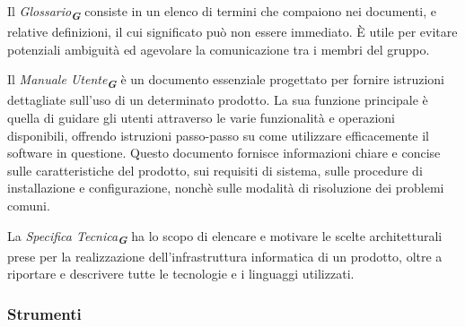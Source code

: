 Il \emph{Glossario}\textsubscript{\textit{\textbf{G}}} consiste in un elenco di termini che compaiono nei documenti, e relative definizioni, 
il cui significato può non essere immediato. È utile per evitare potenziali ambiguità ed agevolare la comunicazione tra i membri del gruppo.

Il \emph{Manuale Utente}\textsubscript{\textit{\textbf{G}}} è un documento essenziale progettato per fornire istruzioni dettagliate
sull’uso di un determinato prodotto. La sua funzione principale è quella di guidare gli utenti attraverso le varie funzionalità e operazioni disponibili, 
offrendo istruzioni passo-passo su come utilizzare efficacemente il software in questione. Questo documento fornisce informazioni chiare e concise 
sulle caratteristiche del prodotto, sui requisiti di sistema, sulle procedure di installazione e configurazione, nonchè sulle modalità 
di risoluzione dei problemi comuni.

La \emph{Specifica Tecnica}\textsubscript{\textit{\textbf{G}}} ha lo scopo di elencare e motivare le scelte architetturali prese per
la realizzazione dell’infrastruttura informatica di un prodotto, oltre a riportare e descrivere tutte le tecnologie e i linguaggi utilizzati.


\subsubsection{Strumenti}

